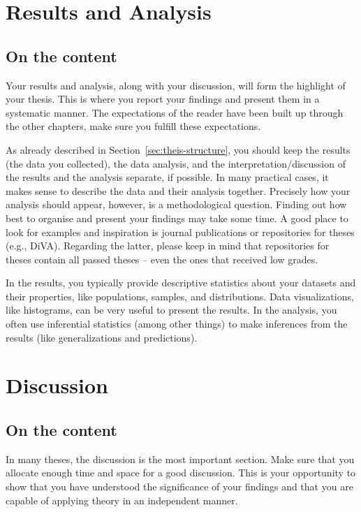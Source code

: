 \documentclass[a4paper,twoside]{bth}
\begin{document}
\chapter{Results and Analysis}
\label{chp:results}
\section{On the content}
Your results and analysis, along with your discussion, will form the highlight of your thesis. This is where you report your findings and present them in a systematic manner. The expectations of the reader have been built up through the other chapters, make sure you fulfill these expectations.

As already described in Section~\ref{sec:theis-structure}, you should keep the results (the data you collected), the data analysis, and the interpretation/discussion of the results and the analysis separate, if possible. In many practical cases, it makes sense to describe the data and their analysis together.
Precisely how your analysis should appear, however, is a methodological question. Finding out how best to organise and present your findings may take some time. A good place to look for examples and inspiration is journal publications or repositories for theses (e.g., DiVA). Regarding the latter, please keep in mind that repositories for theses contain all passed theses -- even the ones that received low grades. 

In the results, you typically provide descriptive statistics about your datasets and their properties, like populations, samples, and distributions.
Data visualizations, like histograms, can be very useful to present the results. In the analysis, you often use inferential statistics (among other things) to make inferences from the results (like generalizations and predictions).


\chapter{Discussion}
\label{chp:discussion}
\section{On the content}
In many theses, the discussion is the most important section. Make sure that you allocate enough time and space for a good discussion. This is your opportunity to show that you have understood the significance of your findings and that you are capable of applying theory in an independent manner.
\end{document}
